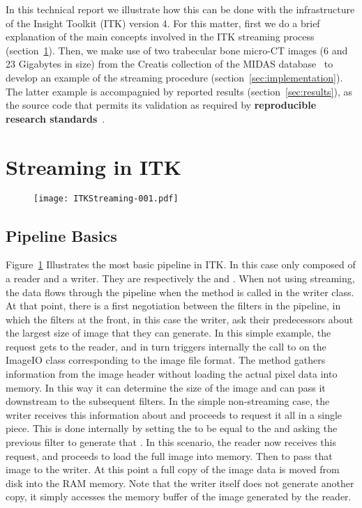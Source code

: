 \documentclass{InsightArticle}
\begin{document}
In this technical report we illustrate how this can be done with the
infrastructure of the Insight Toolkit (ITK) version 4. For this matter, first we do a
brief explanation of the main concepts involved in the ITK streaming process
(section~\ref{sec:stream}). Then, we make use of two trabecular bone micro-CT images
(6 and 23 Gigabytes in size) from the Creatis collection of the MIDAS
database~\cite{Zuluaga2011a} to develop an example of the streaming procedure
(section~\ref{sec:implementation}). The latter example is accompagnied by
reported results (section~\ref{sec:results}), as the source code
that permits its validation as required by \textbf{reproducible research
standards}~\cite{Stodden2009}.

\section{Streaming in ITK}
\label{sec:stream}

\begin{figure}
\center
\texttt{[image: ITKStreaming-001.pdf]}
\label{fig:StreamingFigure1}
\end{figure}

\subsection{Pipeline Basics}
Figure~\ref{fig:StreamingFigure1} Illustrates the most basic pipeline in ITK.
In this case only composed of a reader and a writer. They are respectively the
 and . When not using streaming,
the data flows through the pipeline when the method  is called in
the writer class. At that point, there is a first negotiation between the filters
in the pipeline, in which the filters at the front, in this case the writer, ask
their predecessors about the largest size of image that they can generate. In this
simple example, the request gets to the reader, and in turn triggers internally
the call to  on the ImageIO class corresponding to
the image file format. The  method gathers information
from the image header without loading the actual pixel data into memory. In this
way it can determine the size of the image  and can
pass it downstream to the subsequent filters. In the simple non-streaming case,
the writer receives this information about  and
proceeds to request it all in a single piece. This is done internally by
setting the  to be equal to the
 and asking the previous filter to generate that
. In this scenario, the reader now receives this request,
and proceeds to load the full image into memory. Then to pass that image to the
writer. At this point a full copy of the image data is moved from disk into the
RAM memory. Note that the writer itself does not generate another copy, it
simply accesses the memory buffer of the image generated by the reader.
\end{document}
